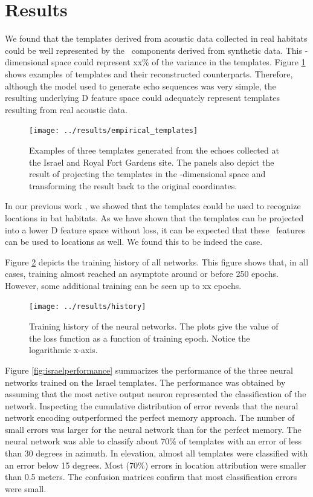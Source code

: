 \documentclass[preprint,5p]{elsarticle}
\begin{document}
\section{Results}

We found that the templates derived from acoustic data collected in real habitats could be well represented by the \pca\ components derived from synthetic data. This \pca-dimensional space could represent xx\% of the variance in the templates. Figure \ref{fig:empiricaltemplates} shows examples of templates and their reconstructed counterparts. Therefore, although the model used to generate echo sequences was very simple, the resulting underlying \pca D feature space could adequately represent templates resulting from real acoustic data.

\begin{figure}[tb]
	\centering
	\texttt{[image: ../results/empirical\_templates]}
	\caption{Examples of three templates generated from the echoes collected at the Israel and Royal Fort Gardens site. The panels also depict the result of projecting the templates in the 
		\pca-dimensional space and transforming the result back to the original coordinates.}
	\label{fig:empiricaltemplates}
\end{figure}

In our previous work \cite{Vanderelst2016}, we showed that the templates could be used to recognize locations in bat habitats. As we have shown that the templates can be projected into a lower \pca D feature space without loss, it can be expected that these \pca\ features can be used to locations as well. We found this to be indeed the case.

Figure \ref{fig:history} depicts the training history of all networks. This figure shows that, in all cases, training almost reached an asymptote around or before 250 epochs. However, some additional training can be seen up to xx epochs.

\begin{figure}
	\centering
	\texttt{[image: ../results/history]}
	\caption{Training history of the neural networks. The plots give the value of the loss function as a function of training epoch. Notice the logarithmic x-axis.}
	\label{fig:history}
\end{figure}

Figure \ref{fig:israelperformance} summarizes the performance of the three neural networks trained on the Israel templates. The performance was obtained by assuming that the most active output neuron represented the classification of the network. Inspecting the cumulative distribution of error reveals that the neural network encoding outperformed the perfect memory approach. The number of small errors was larger for the neural network than for the perfect memory. The neural network was able to classify about 70\% of templates with an error of less than 30 degrees in azimuth. In elevation, almost all templates were classified with an error below 15 degrees. Most (70\%) errors in location attribution were smaller than 0.5 meters. The confusion matrices confirm that most classification errors were small.
\end{document}
